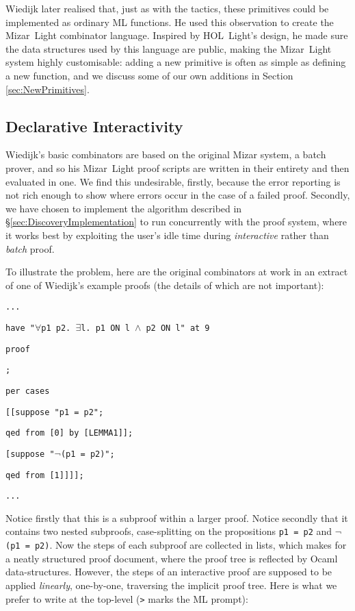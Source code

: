 Wiedijk later realised that, just as with the tactics, these primitives could be implemented as ordinary ML functions. He used this observation to create the Mizar~Light combinator language. Inspired by HOL~Light's design, he made sure the data structures used by this language are public, making the Mizar~Light system highly customisable: adding a new primitive is often as simple as defining a new function, and we discuss some of our own additions in Section \ref{sec:NewPrimitives}.

\subsection{Declarative Interactivity}
Wiedijk's basic combinators are based on the original Mizar system, a batch prover, and so his Mizar~Light proof scripts are written in their entirety and then evaluated in one. We find this undesirable, firstly, because the error reporting is not rich enough to show where errors occur in the case of a failed proof. Secondly, we have chosen to implement the algorithm described in \S\ref{sec:DiscoveryImplementation} to run concurrently with the proof system, where it works best by exploiting the user's idle time during \emph{interactive} rather than \emph{batch} proof.

To illustrate the problem, here are the original combinators at work in an extract of one of Wiedijk's example proofs (the details of which are not important):

\vspace{0.5cm}
\begin{minipage}{\linewidth}
  \footnotesize
  \texttt{...}

  \texttt{have "$\forall$p1 p2. $\exists$l. p1 ON l $\wedge$ p2 ON l" at 9}

  \texttt{proof}

  \texttt{\enspace [fix ["p1:Point"; "p2:Point"];}

  \texttt{\quad per cases}

  \texttt{\quad\enspace[[suppose "p1 = p2";}

  \texttt{\qquad\enspace qed from [0] by [LEMMA1]];}

  \texttt{\qquad [suppose "$\neg$(p1 = p2)";}

  \texttt{\qquad\enspace qed from [1]]]];}

  \texttt{...}
\end{minipage}
\vspace{0.5cm}

Notice firstly that this is a subproof within a larger proof. Notice secondly that it contains two nested subproofs, case-splitting on the propositions \texttt{p1 = p2} and \texttt{$\neg$(p1 = p2)}. Now the steps of each subproof are collected in lists, which makes for a neatly structured proof document, where the proof tree is reflected by Ocaml data-structures. However, the steps of an interactive proof are supposed to be applied \emph{linearly}, one-by-one, traversing the implicit proof tree. Here is what we prefer to write at the top-level (\texttt{>} marks the ML prompt):

